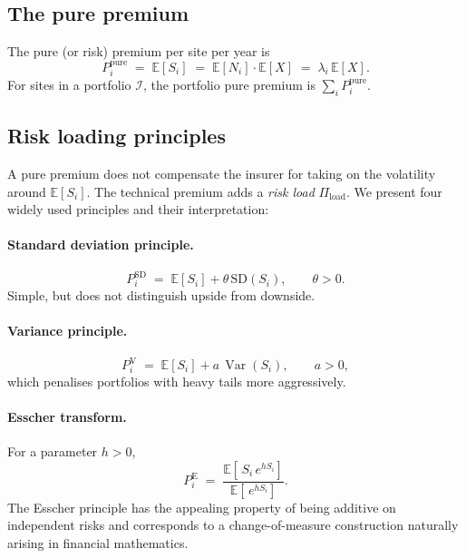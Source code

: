 \documentclass[11pt,a4paper]{article}
\theoremstyle{ia}
\newcommand{\E}{\mathbb{E}}
\newcommand{\Var}{\operatorname{Var}}
\newcommand{\1}{\mathbf{1}}
\begin{document}
\subsection{The pure premium}

The pure (or risk) premium per site per year is
\begin{equation}\label{eq:pure}
   P^{\mathrm{pure}}_i \;=\; \E[S_i]
   \;=\; \E[N_i]\cdot\E[X]
   \;=\; \lambda_i\,\E[X] .
\end{equation}
For sites in a portfolio $\mathcal{I}$, the portfolio pure premium is
$\sum_i P^{\mathrm{pure}}_i$.

\subsection{Risk loading principles}\label{ss:loadings}

A pure premium does not compensate the insurer for taking on the
volatility around $\E[S_i]$. The technical premium adds a
\emph{risk load} $\Pi_{\mathrm{load}}$. We present four widely used
principles and their interpretation:

\paragraph{Standard deviation principle.}
\begin{equation}\label{eq:sdp}
   P^{\mathrm{SD}}_i \;=\; \E[S_i] + \theta\,\mathrm{SD}(S_i),
   \qquad \theta>0.
\end{equation}
Simple, but does not distinguish upside from downside.

\paragraph{Variance principle.}
\begin{equation}\label{eq:vp}
   P^{\mathrm{V}}_i \;=\; \E[S_i] + a\,\Var(S_i),\qquad a>0,
\end{equation}
which penalises portfolios with heavy tails more aggressively.

\paragraph{Esscher transform.}
For a parameter $h>0$,
\begin{equation}\label{eq:esscher}
   P^{\mathrm{E}}_i \;=\;
   \frac{\E[\,S_i\,e^{h S_i}]}{\E[\,e^{h S_i}]}.
\end{equation}
The Esscher principle has the appealing property of being additive on
independent risks and corresponds to a change-of-measure construction
naturally arising in financial mathematics.
\end{document}
